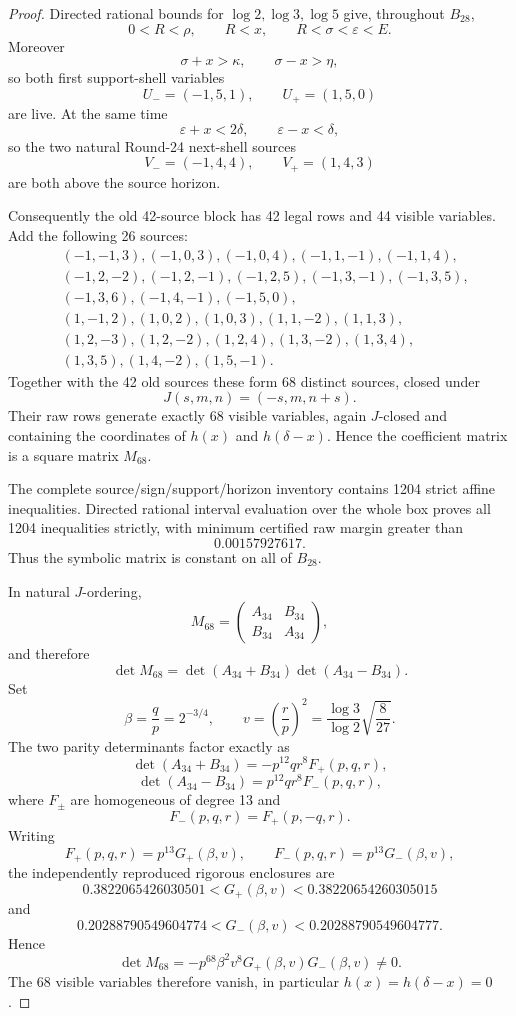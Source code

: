 \begin{proof}
Directed rational bounds for \(\log2,\log3,\log5\) give, throughout
\(B_{28}\),
\[
0<R<\rho,\qquad R<x,\qquad R<\sigma<\varepsilon<E.
\]
Moreover
\[
\sigma+x>\kappa,\qquad \sigma-x>\eta,
\]
so both first support-shell variables
\[
U_-=(-1,5,1),\qquad U_+=(1,5,0)
\]
are live.  At the same time
\[
\varepsilon+x<2\delta,\qquad
\varepsilon-x<\delta,
\]
so the two natural Round-24 next-shell sources
\[
V_-=(-1,4,4),\qquad V_+=(1,4,3)
\]
are both above the source horizon.

Consequently the old 42-source block has 42 legal rows and 44 visible
variables.  Add the following 26 sources:
\[
\begin{aligned}
&(-1,-1,3),(-1,0,3),(-1,0,4),(-1,1,-1),(-1,1,4),\\
&(-1,2,-2),(-1,2,-1),(-1,2,5),(-1,3,-1),(-1,3,5),\\
&(-1,3,6),(-1,4,-1),(-1,5,0),\\
&(1,-1,2),(1,0,2),(1,0,3),(1,1,-2),(1,1,3),\\
&(1,2,-3),(1,2,-2),(1,2,4),(1,3,-2),(1,3,4),\\
&(1,3,5),(1,4,-2),(1,5,-1).
\end{aligned}
\]
Together with the 42 old sources these form 68 distinct sources, closed
under
\[
J(s,m,n)=(-s,m,n+s).
\]
Their raw rows generate exactly 68 visible variables, again \(J\)-closed
and containing the coordinates of \(h(x)\) and \(h(\delta-x)\).  Hence the
coefficient matrix is a square matrix \(M_{68}\).

The complete source/sign/support/horizon inventory contains 1204 strict
affine inequalities.  Directed rational interval evaluation over the whole
box proves all 1204 inequalities strictly, with minimum certified raw margin
greater than
\[
0.00157927617.
\]
Thus the symbolic matrix is constant on all of \(B_{28}\).

In natural \(J\)-ordering,
\[
M_{68}
=
\begin{pmatrix}
A_{34}&B_{34}\\
B_{34}&A_{34}
\end{pmatrix},
\]
and therefore
\[
\det M_{68}
=
\det(A_{34}+B_{34})\det(A_{34}-B_{34}).
\]
Set
\[
\beta=\frac qp=2^{-3/4},
\qquad
v=\left(\frac rp\right)^2
=\frac{\log3}{\log2}\sqrt{\frac8{27}}.
\]
The two parity determinants factor exactly as
\[
\det(A_{34}+B_{34})
=
-p^{12}qr^8F_+(p,q,r),
\]
\[
\det(A_{34}-B_{34})
=
p^{12}qr^8F_-(p,q,r),
\]
where \(F_\pm\) are homogeneous of degree 13 and
\[
F_-(p,q,r)=F_+(p,-q,r).
\]
Writing
\[
F_+(p,q,r)=p^{13}G_+(\beta,v),
\qquad
F_-(p,q,r)=p^{13}G_-(\beta,v),
\]
the independently reproduced rigorous enclosures are
\[
0.3822065426030501
<
G_+(\beta,v)
<
0.38220654260305015
\]
and
\[
0.20288790549604774
<
G_-(\beta,v)
<
0.20288790549604777.
\]
Hence
\[
\det M_{68}
=
-p^{68}\beta^2v^8G_+(\beta,v)G_-(\beta,v)
\ne0.
\]
The 68 visible variables therefore vanish, in particular
\(h(x)=h(\delta-x)=0\).
\end{proof}

